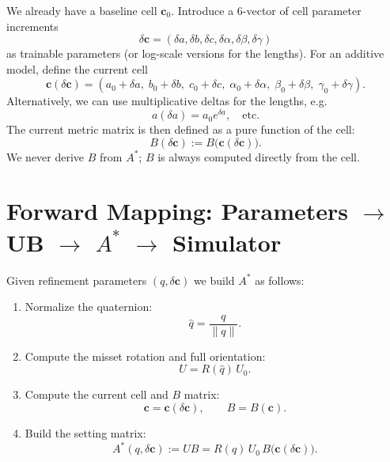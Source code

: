\documentclass[11pt]{article}
\begin{document}
We already have a baseline cell $\mathbf{c}_0$.
Introduce a 6-vector of cell parameter increments
\begin{equation}
  \delta\mathbf{c} =
  (\delta a, \delta b, \delta c, \delta\alpha, \delta\beta, \delta\gamma)
\end{equation}
as trainable parameters (or log-scale versions for the lengths).
For an additive model, define the current cell
\begin{equation}
  \mathbf{c}(\delta\mathbf{c}) =
  (a_0 + \delta a,\;
   b_0 + \delta b,\;
   c_0 + \delta c,\;
   \alpha_0 + \delta\alpha,\;
   \beta_0 + \delta\beta,\;
   \gamma_0 + \delta\gamma).
\end{equation}
Alternatively, we can use multiplicative deltas for the lengths, e.g.
\begin{equation}
  a(\delta a) = a_0 e^{\delta a}, \quad \text{etc.}
\end{equation}
The current metric matrix is then defined as a pure function of the cell:
\begin{equation}
  B(\delta\mathbf{c}) := B\big(\mathbf{c}(\delta\mathbf{c})\big).
\end{equation}
We never derive $B$ from $A^\ast$; $B$ is always computed directly from
the cell.

\section{Forward Mapping: Parameters $\to$ UB $\to$ $A^\ast$ $\to$ Simulator}

Given refinement parameters $(q, \delta\mathbf{c})$ we build $A^\ast$ as follows:

\begin{enumerate}
  \item Normalize the quaternion:
        \begin{equation}
          \hat{q} = \frac{q}{\|q\|}.
        \end{equation}
  \item Compute the misset rotation and full orientation:
        \begin{equation}
          U = R(\hat{q})\,U_0.
        \end{equation}
  \item Compute the current cell and $B$ matrix:
        \begin{equation}
          \mathbf{c} = \mathbf{c}(\delta\mathbf{c}), \qquad
          B = B(\mathbf{c}).
        \end{equation}
  \item Build the setting matrix:
        \begin{equation}
          A^\ast(q,\delta\mathbf{c}) := U B
          = R(\hat{q})\,U_0\,B\big(\mathbf{c}(\delta\mathbf{c})\big).
        \end{equation}
\end{enumerate}
\end{document}
